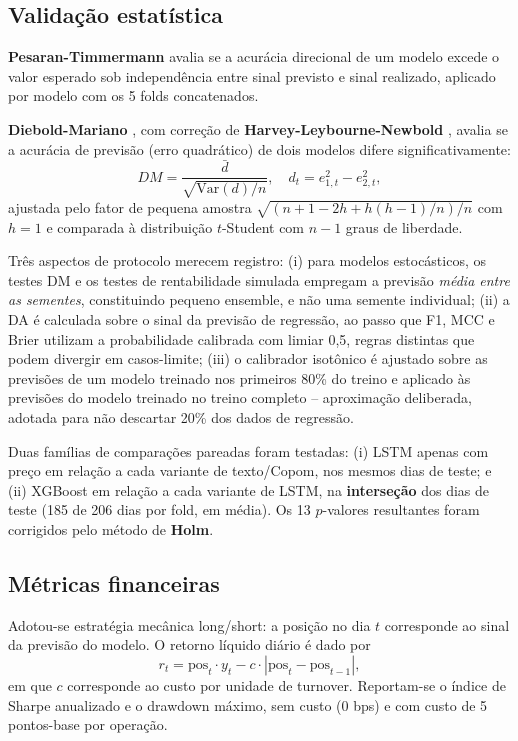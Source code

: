 \documentclass[conference]{IEEEtran}
\begin{document}
\subsection{Valida\c{c}\~ao estat\'istica}

\textbf{Pesaran-Timmermann} \cite{pesaran1992} avalia se a acur\'acia direcional de um modelo excede o valor esperado sob independ\^encia entre sinal previsto e sinal realizado, aplicado por modelo com os 5 folds concatenados.

\textbf{Diebold-Mariano} \cite{diebold1995}, com corre\c{c}\~ao de \textbf{Harvey-Leybourne-Newbold} \cite{harvey1997}, avalia se a acur\'acia de previs\~ao (erro quadr\'atico) de dois modelos difere significativamente:
\begin{equation}
DM = \frac{\bar{d}}{\sqrt{\mathrm{Var}(d)/n}}, \quad d_t = e_{1,t}^2 - e_{2,t}^2,
\label{eq:dm}
\end{equation}
ajustada pelo fator de pequena amostra $\sqrt{(n+1-2h+h(h-1)/n)/n}$ com $h=1$ e comparada \`a distribui\c{c}\~ao $t$-Student com $n-1$ graus de liberdade.

Tr\^es aspectos de protocolo merecem registro: (i) para modelos estoc\'asticos, os testes DM e os testes de rentabilidade simulada empregam a previs\~ao \emph{m\'edia entre as sementes}, constituindo pequeno ensemble, e n\~ao uma semente individual; (ii) a DA \'e calculada sobre o sinal da previs\~ao de regress\~ao, ao passo que F1, MCC e Brier utilizam a probabilidade calibrada com limiar 0,5, regras distintas que podem divergir em casos-limite; (iii) o calibrador isot\^onico \'e ajustado sobre as previs\~oes de um modelo treinado nos primeiros 80\% do treino e aplicado \`as previs\~oes do modelo treinado no treino completo -- aproxima\c{c}\~ao deliberada, adotada para n\~ao descartar 20\% dos dados de regress\~ao.

Duas fam\'ilias de compara\c{c}\~oes pareadas foram testadas: (i) LSTM apenas com pre\c{c}o em rela\c{c}\~ao a cada variante de texto/Copom, nos mesmos dias de teste; e (ii) XGBoost em rela\c{c}\~ao a cada variante de LSTM, na \textbf{interse\c{c}\~ao} dos dias de teste (185 de 206 dias por fold, em m\'edia). Os 13 $p$-valores resultantes foram corrigidos pelo m\'etodo de \textbf{Holm}.

\subsection{M\'etricas financeiras}

Adotou-se estrat\'egia mec\^anica long/short: a posi\c{c}\~ao no dia $t$ corresponde ao sinal da previs\~ao do modelo. O retorno l\'iquido di\'ario \'e dado por
\begin{equation}
r_t = \text{pos}_t \cdot y_t - c \cdot |\text{pos}_t - \text{pos}_{t-1}|,
\end{equation}
em que $c$ corresponde ao custo por unidade de turnover. Reportam-se o \'indice de Sharpe anualizado e o drawdown m\'aximo, sem custo (0 bps) e com custo de 5 pontos-base por opera\c{c}\~ao.
\end{document}
